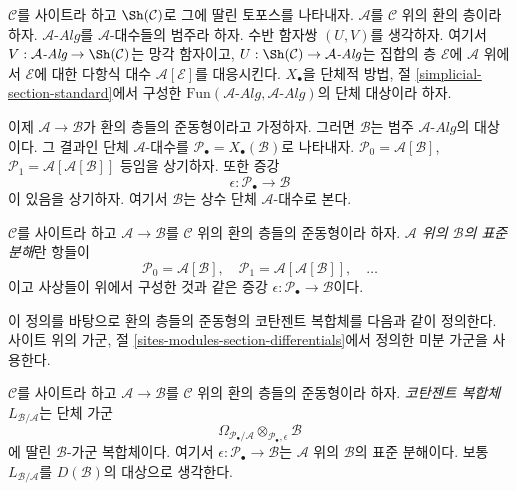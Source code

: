 \medskip\noindent
$\mathcal{C}$를 사이트라 하고 $\Sh(\mathcal{C})$로 그에 딸린 토포스를
나타내자. $\mathcal{A}$를 $\mathcal{C}$ 위의 환의 층이라 하자.
$\mathcal{A}\textit{-Alg}$를 $\mathcal{A}$-대수들의 범주라 하자. 수반
함자쌍 $(U, V)$를 생각하자. 여기서
$V : \mathcal{A}\textit{-Alg} \to \Sh(\mathcal{C})$는 망각 함자이고,
$U : \Sh(\mathcal{C}) \to \mathcal{A}\textit{-Alg}$는 집합의 층
$\mathcal{E}$에 $\mathcal{A}$ 위에서 $\mathcal{E}$에 대한 다항식 대수
$\mathcal{A}[\mathcal{E}]$를 대응시킨다. $X_\bullet$을 단체적 방법, 절
\ref{simplicial-section-standard}에서 구성한
$\text{Fun}(\mathcal{A}\textit{-Alg}, \mathcal{A}\textit{-Alg})$의 단체
대상이라 하자.

\medskip\noindent
이제 $\mathcal{A} \to \mathcal{B}$가 환의 층들의 준동형이라고 가정하자.
그러면 $\mathcal{B}$는 범주 $\mathcal{A}\textit{-Alg}$의 대상이다. 그 결과인
단체 $\mathcal{A}$-대수를
$\mathcal{P}_\bullet = X_\bullet(\mathcal{B})$로 나타내자.
$\mathcal{P}_0 = \mathcal{A}[\mathcal{B}]$,
$\mathcal{P}_1 = \mathcal{A}[\mathcal{A}[\mathcal{B}]]$ 등임을 상기하자. 또한
증강
$$
\epsilon : \mathcal{P}_\bullet \longrightarrow \mathcal{B}
$$
이 있음을 상기하자. 여기서 $\mathcal{B}$는 상수 단체
$\mathcal{A}$-대수로 본다.

\begin{definition}
\label{definition-standard-resolution-sheaves-rings}
$\mathcal{C}$를 사이트라 하고 $\mathcal{A} \to \mathcal{B}$를
$\mathcal{C}$ 위의 환의 층들의 준동형이라 하자. {\it $\mathcal{A}$ 위의
$\mathcal{B}$의 표준 분해}란 항들이
$$
\mathcal{P}_0 = \mathcal{A}[\mathcal{B}],\quad
\mathcal{P}_1 = \mathcal{A}[\mathcal{A}[\mathcal{B}]],\quad \ldots
$$
이고 사상들이 위에서 구성한 것과 같은 증강
$\epsilon : \mathcal{P}_\bullet \to \mathcal{B}$이다.
\end{definition}

\noindent
이 정의를 바탕으로 환의 층들의 준동형의 코탄젠트 복합체를 다음과 같이
정의한다. 사이트 위의 가군, 절
\ref{sites-modules-section-differentials}에서 정의한 미분 가군을 사용한다.

\begin{definition}
\label{definition-cotangent-complex-morphism-sheaves-rings}
$\mathcal{C}$를 사이트라 하고 $\mathcal{A} \to \mathcal{B}$를
$\mathcal{C}$ 위의 환의 층들의 준동형이라 하자. {\it 코탄젠트 복합체}
$L_{\mathcal{B}/\mathcal{A}}$는 단체 가군
$$
\Omega_{\mathcal{P}_\bullet/\mathcal{A}}
\otimes_{\mathcal{P}_\bullet, \epsilon} \mathcal{B}
$$
에 딸린 $\mathcal{B}$-가군 복합체이다. 여기서
$\epsilon : \mathcal{P}_\bullet \to \mathcal{B}$는 $\mathcal{A}$ 위의
$\mathcal{B}$의 표준 분해이다. 보통 $L_{\mathcal{B}/\mathcal{A}}$를
$D(\mathcal{B})$의 대상으로 생각한다.
\end{definition}

